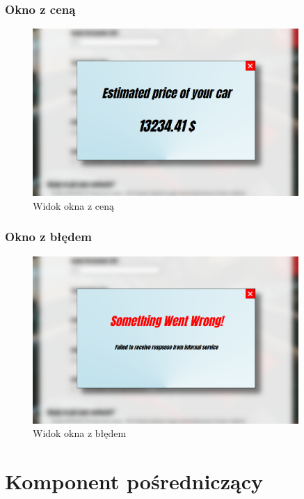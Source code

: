 \documentclass[12pt, a4paper]{report}
\begin{document}
\subsection{Okno z ceną}
\begin{figure}[H]
    \centering
    \includegraphics[width=0.9\textwidth]{images/price_view}
    \caption{Widok okna z ceną}
\end{figure}
\subsection{Okno z błędem}
\begin{figure}[H]
    \centering
    \includegraphics[width=0.9\textwidth]{images/error_view}
    \caption{Widok okna z błędem}
\end{figure}


\chapter{Komponent pośredniczący}
\end{document}
